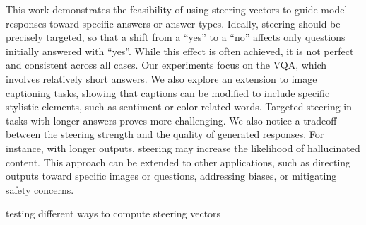 

This work demonstrates the feasibility of using steering vectors to guide model responses toward specific answers or answer types. Ideally, steering should be precisely targeted, so that a shift from a “yes” to a “no” affects only questions initially answered with “yes”. While this effect is often achieved, it is not perfect and consistent across all cases. Our experiments focus on the VQA, which involves relatively short answers. We also explore an extension to image captioning tasks, showing that captions can be modified to include specific stylistic elements, such as sentiment or color-related words. Targeted steering in tasks with longer answers proves more challenging. We also notice a tradeoff between the steering strength and the quality of generated responses. For instance, with longer outputs, steering may increase the likelihood of hallucinated content. This approach can be extended to other applications, such as directing outputs toward specific images or questions, addressing biases, or mitigating safety concerns.

testing different ways to compute steering vectors



